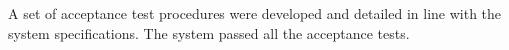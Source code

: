 \documentclass[class=report,11pt,crop=false]{standalone}
\begin{document}
A set of acceptance test procedures were developed and detailed in line with the system specifications. The system passed all the acceptance tests. 


\ifstandalone

\printnoidxglossary[type=\acronymtype,nonumberlist]
\fi
\end{document}
